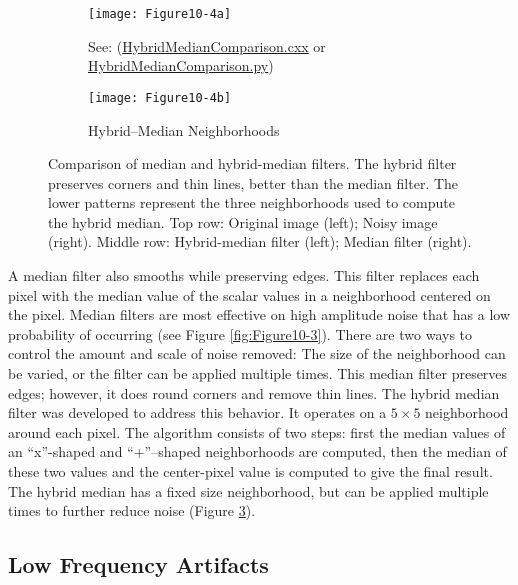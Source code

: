 \begin{figure}[htb]
	\begin{subfigure}[h]{0.96\linewidth}
		\texttt{[image: Figure10-4a]}
		\captionsetup{justification=centering}
		\caption*{See: (\href{https://lorensen.github.io/VTKExamples/site/Cxx/ImageProcessing/HybridMedianComparison/}{HybridMedianComparison.cxx} or \href{https://lorensen.github.io/VTKExamples/site/Python/ImageProcessing/HybridMedianComparison/}{HybridMedianComparison.py})}
		\label{fig:Figure10-4a}
	\end{subfigure}
	\hfill
	\begin{subfigure}[h]{0.32\linewidth}
		\texttt{[image: Figure10-4b]}
		\captionsetup{justification=centering}
		\caption*{Hybrid--Median Neighborhoods}
		\label{fig:Figure10-4b}
	\end{subfigure}
	\caption{Comparison of median and hybrid-median filters. The hybrid filter preserves corners and thin lines, better than the median filter. The lower patterns represent the three neighborhoods used to compute the hybrid median. Top row: Original image (left); Noisy image (right). Middle row: Hybrid-median filter (left); Median filter (right).}\label{fig:Figure10-4}
\end{figure}

A median filter also smooths while preserving edges. This filter replaces each pixel with the median value of the scalar values in a neighborhood centered on the pixel. Median filters are most effective on high amplitude noise that has a low probability of occurring (see Figure \ref{fig:Figure10-3}). There are two ways to control the amount and scale of noise removed: The size of the neighborhood can be varied, or the filter can be applied multiple times. This median filter preserves edges; however, it does round corners and remove thin lines. The hybrid median filter was developed to address this behavior. It operates on a $5 \times 5$ neighborhood around each pixel. The algorithm consists of two steps: first the median values of an ``x''-shaped and ``+''--shaped neighborhoods are computed, then the median of these two values and the center-pixel value is computed to give the final result. The hybrid median has a fixed size neighborhood, but can be applied multiple times to further reduce noise (Figure \ref{fig:Figure10-4}).

\subsection{Low Frequency Artifacts}

